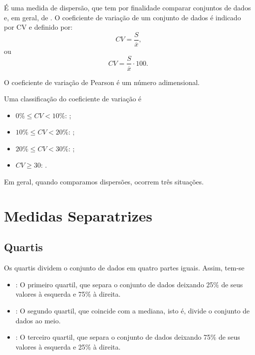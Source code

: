 \documentclass[11pt,fleqn]{book}
\numberwithin{mpicture}{chapter}
\numberwithin{mtable}{chapter}
\numberwithin{mframe}{chapter}
\begin{document}
É uma medida de dispersão, que tem por finalidade comparar conjuntos de dados  e, em geral, de . O coeficiente de variação de um conjunto de dados é indicado por CV e definido por:
\begin{equation}
	CV=\frac{S}{\overline{x}}\text{,}
\end{equation}
ou
\begin{equation}
	CV=\frac{S}{\overline{x}}\cdot 100\text{.}
\end{equation}

O coeficiente de variação de Pearson é um número adimensional.

Uma classificação do coeficiente de variação é
\begin{itemize}
	\item $0\%\leqslant CV < 10\%$: ;
	\item $10\%\leqslant CV < 20\%$: ;
	\item $20\%\leqslant CV < 30\%$: ;
	\item $CV \geqslant 30$: .
\end{itemize}

Em geral, quando comparamos dispersões, ocorrem três situações.


\section{Medidas Separatrizes}

\subsection{Quartis}

Os quartis dividem o conjunto de dados em quatro partes iguais. Assim, tem-se
\begin{itemize}
	\item {}: O primeiro quartil, que separa o conjunto de dados deixando 25\% de seus valores à esquerda e 75\% à direita.
	\item {}: O segundo quartil, que coincide com a mediana, isto é, divide o conjunto de dados ao meio.
	\item {}: O terceiro quartil, que separa o conjunto de dados deixando 75\% de seus valores à esquerda e 25\% à direita.
\end{itemize}
\end{document}
